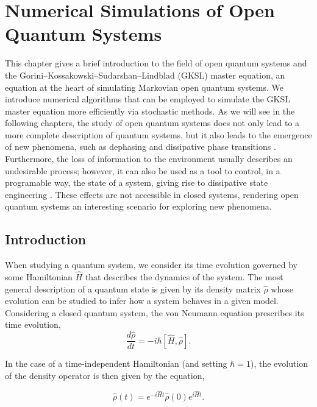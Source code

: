 \chapter{Numerical Simulations of Open Quantum Systems}
\thispagestyle{empty}
\label{chap:tech_sec}

This chapter gives a brief introduction to the field of open quantum systems and the Gorini–Kossakowski–Sudarshan–Lindblad (GKSL) master equation, an equation at the heart of simulating Markovian open quantum systems. We introduce numerical algorithms that can be employed to simulate the GKSL master equation more efficiently via stochastic methods. As we will see in the following chapters, the study of open quantum systems does not only lead to a more complete description of quantum systems, but it also leads to the emergence of new phenomena, such as dephasing \cite{pichler2010,sarkar2014} and dissipative phase transitions \cite{diehl2008, carmichael2015, kessler2012, minganti2018}. Furthermore, the loss of information to the environment usually describes an undesirable process; however, it can also be used as a tool to control, in a programable way, the state of a system, giving rise to dissipative state engineering \cite{verstraete2009, muller2012, vidanovic2014}. These effects are not accessible in closed systems, rendering open quantum systems an interesting scenario for exploring new phenomena.

\section{Introduction}

When studying a quantum system, we consider its time evolution governed by some Hamiltonian $\hat{H}$ that describes the dynamics of the system. The most general description of a quantum state is given by its density matrix $\hat{\rho}$ whose evolution can be studied to infer how a system behaves in a given model. Considering a closed quantum system, the von Neumann equation prescribes its time evolution,
\begin{equation}
    \frac{d \hat{\rho}}{dt} = -i \hbar [\hat{H}, \hat{\rho}].
\end{equation}

In the case of a time-independent Hamiltonian (and setting $\hbar =1$), the evolution of the density operator is then given by the equation,

\begin{equation}
    \hat{\rho}(t) = e^{-i \hat{H} t} \hat{\rho}(0) e^{i \hat{H} t}.
\end{equation}

